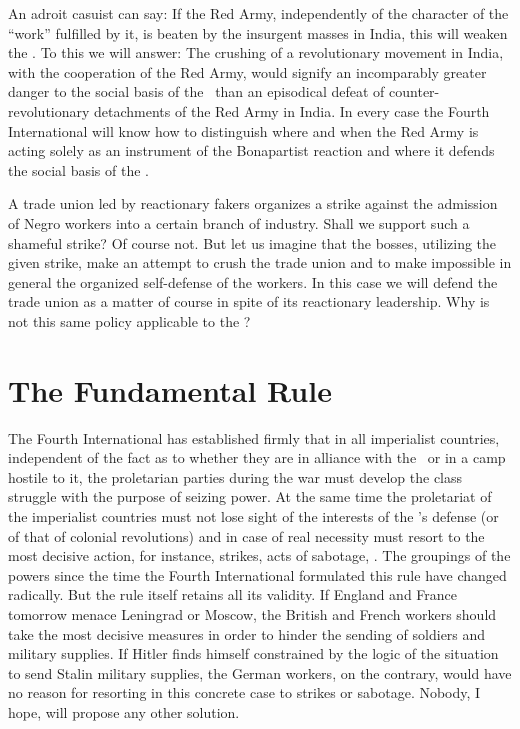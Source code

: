 An adroit casuist can say: If the Red Army, independently of the character of the “work” fulfilled by it, is beaten by the insurgent masses in India, this will weaken the \USSR. To this we will answer: The crushing of a revolutionary movement in India, with the cooperation of the Red Army, would signify an incomparably greater danger to the social basis of the \USSR\ than an episodical defeat of counter-revolutionary detachments of the Red Army in India. In every case the Fourth International will know how to distinguish where and when the Red Army is acting solely as an instrument of the Bonapartist reaction and where it defends the social basis of the \USSR.

A trade union led by reactionary fakers organizes a strike against the admission of Negro workers into a certain branch of industry. Shall we support such a shameful strike? Of course not. But let us imagine that the bosses, utilizing the given strike, make an attempt to crush the trade union and to make impossible in general the organized self-defense of the workers. In this case we will defend the trade union as a matter of course in spite of its reactionary leadership. Why is not this same policy applicable to the \USSR?
\nowidow

\section*{The Fundamental Rule}

The Fourth International has established firmly that in all imperialist countries, independent of the fact as to whether they are in alliance with the \USSR\ or in a camp hostile to it, the proletarian parties during the war must develop the class struggle with the purpose of seizing power. At the same time the proletariat of the imperialist countries must not lose sight of the interests of the \USSR’s defense (or of that of colonial revolutions) and in case of real necessity must resort to the most decisive action, for instance, strikes, acts of sabotage, \etc. The groupings of the powers since the time the Fourth International formulated this rule have changed radically. But the rule itself retains all its validity. If England and France tomorrow menace Leningrad or Moscow, the British and French workers should take the most decisive measures in order to hinder the sending of soldiers and military supplies. If Hitler finds himself constrained by the logic of the situation to send Stalin military supplies, the German workers, on the contrary, would have no reason for resorting in this concrete case to strikes or sabotage. Nobody, I hope, will propose any other solution.

